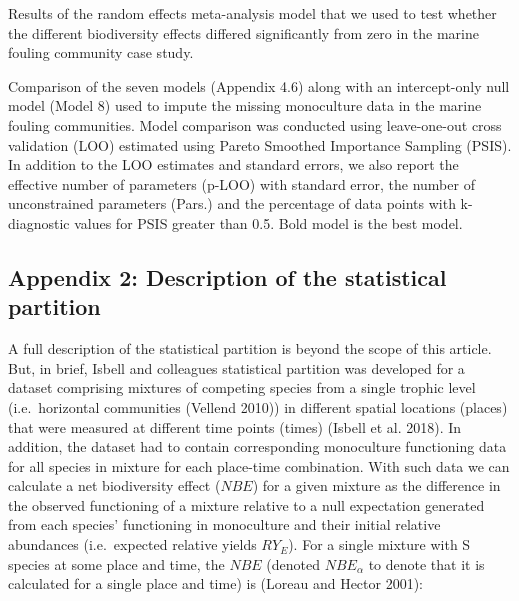 \documentclass[
  letterpaper,
  DIV=11,
  numbers=noendperiod]{scrartcl}
\begin{document}
\begin{table}

\caption{\label{tbl-s2}Results of the random effects meta-analysis model
that we used to test whether the different biodiversity effects differed
significantly from zero in the marine fouling community case study.}


\end{table}%

\begin{table}

\caption{\label{tbl-s3}Comparison of the seven models (Appendix 4.6)
along with an intercept-only null model (Model 8) used to impute the
missing monoculture data in the marine fouling communities. Model
comparison was conducted using leave-one-out cross validation (LOO)
estimated using Pareto Smoothed Importance Sampling (PSIS). In addition
to the LOO estimates and standard errors, we also report the effective
number of parameters (p-LOO) with standard error, the number of
unconstrained parameters (Pars.) and the percentage of data points with
k-diagnostic values for PSIS greater than 0.5. Bold model is the best
model.}


\end{table}%

\subsection{Appendix 2: Description of the statistical
partition}\label{appendix-2-description-of-the-statistical-partition}

A full description of the statistical partition is beyond the scope of
this article. But, in brief, Isbell and colleagues statistical partition
was developed for a dataset comprising mixtures of competing species
from a single trophic level (i.e.~horizontal communities (Vellend 2010))
in different spatial locations (places) that were measured at different
time points (times) (Isbell et al. 2018). In addition, the dataset had
to contain corresponding monoculture functioning data for all species in
mixture for each place-time combination. With such data we can calculate
a net biodiversity effect (\(NBE\)) for a given mixture as the
difference in the observed functioning of a mixture relative to a null
expectation generated from each species' functioning in monoculture and
their initial relative abundances (i.e.~expected relative yields
\(RY_E\)). For a single mixture with S species at some place and time,
the \(NBE\) (denoted \(NBE_{\alpha}\) to denote that it is calculated
for a single place and time) is (Loreau and Hector 2001):
\end{document}
